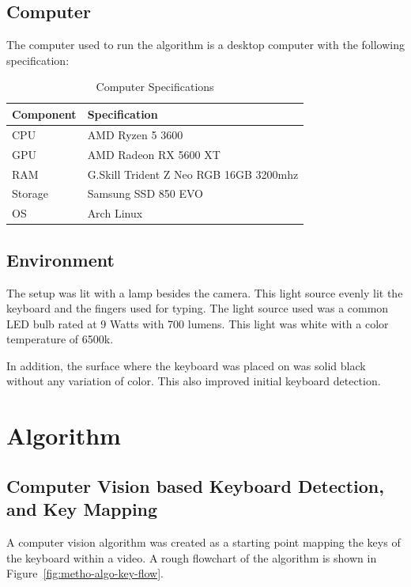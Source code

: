 \documentclass{report}
\begin{document}
\subsection{Computer}
The computer used to run the algorithm is a desktop computer with the following
specification:

\begin{table}[H]
	\small
	\centering
	\begin{tabular}{ p{} p{} }
		\toprule
		Component & Specification                          \\
		\midrule
		CPU       & AMD Ryzen 5 3600                       \\
		GPU       & AMD Radeon RX 5600 XT                  \\
		RAM       & G.Skill Trident Z Neo RGB 16GB 3200mhz \\
		Storage   & Samsung SSD 850 EVO                    \\
		OS        & Arch Linux                             \\
		\bottomrule
	\end{tabular}
	\caption{\label{tab:table-specs}Computer Specifications}
\end{table}

\subsection{Environment}
The setup was lit with a lamp besides the camera. This light source evenly lit
the keyboard and the fingers used for typing. The light source used was a common
LED bulb rated at 9 Watts with 700 lumens. This light was white with a color
temperature of 6500k.

In addition, the surface where the keyboard was placed on was solid black
without any variation of color. This also improved initial keyboard detection.

\section{Algorithm}
\label{section:metho-algo}

\subsection{Computer Vision based Keyboard Detection, and Key Mapping}
\label{section:metho-algo-keyboard}

A computer vision algorithm was created as a starting point
mapping the keys of the keyboard within a video. A rough flowchart of the algorithm
is shown in Figure~\ref{fig:metho-algo-key-flow}.
\end{document}
